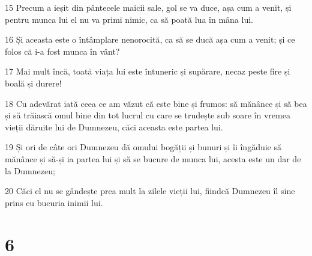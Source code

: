 \par 15 Precum a ieșit din pântecele maicii sale, gol se va duce, așa cum a venit, și pentru munca lui el nu va primi nimic, ca să poată lua în mâna lui.
\par 16 Și aceasta este o întâmplare nenorocită, ca să se ducă așa cum a venit; și ce folos că i-a fost munca în vânt?
\par 17 Mai mult încă, toată viața lui este întuneric și supărare, necaz peste fire și boală și durere!
\par 18 Cu adevărat iată ceea ce am văzut că este bine și frumos: să mănânce și să bea și să trăiască omul bine din tot lucrul cu care se trudește sub soare în vremea vieții dăruite lui de Dumnezeu, căci aceasta este partea lui.
\par 19 Și ori de câte ori Dumnezeu dă omului bogății și bunuri și îi îngăduie să mănânce și să-și ia partea lui și să se bucure de munca lui, acesta este un dar de la Dumnezeu;
\par 20 Căci el nu se gândește prea mult la zilele vieții lui, fiindcă Dumnezeu îl sine prins cu bucuria inimii lui.

\chapter{6}

